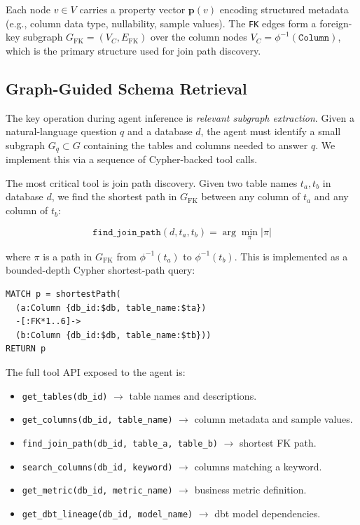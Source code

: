 \documentclass[11pt]{article}
\begin{document}
Each node $v \in V$ carries a property vector $\mathbf{p}(v)$ encoding structured metadata (e.g., column data type, nullability, sample values).
The \texttt{FK} edges form a foreign-key subgraph $G_{\text{FK}} = (V_C, E_{\text{FK}})$ over the column nodes $V_C = \phi^{-1}(\texttt{Column})$, which is the primary structure used for join path discovery.

\subsection{Graph-Guided Schema Retrieval}

The key operation during agent inference is \emph{relevant subgraph extraction}.
Given a natural-language question $q$ and a database $d$, the agent must identify a small subgraph $G_q \subset G$ containing the tables and columns needed to answer $q$.
We implement this via a sequence of Cypher-backed tool calls.

The most critical tool is join path discovery.
Given two table names $t_a, t_b$ in database $d$, we find the shortest path in $G_{\text{FK}}$ between any column of $t_a$ and any column of $t_b$:

\[
\texttt{find\_join\_path}(d, t_a, t_b) = \arg\min_{\pi} |\pi|
\]

where $\pi$ is a path in $G_{\text{FK}}$ from $\phi^{-1}(t_a)$ to $\phi^{-1}(t_b)$.
This is implemented as a bounded-depth Cypher shortest-path query:

\begin{verbatim}
MATCH p = shortestPath(
  (a:Column {db_id:$db, table_name:$ta})
  -[:FK*1..6]->
  (b:Column {db_id:$db, table_name:$tb}))
RETURN p
\end{verbatim}

The full tool API exposed to the agent is:

\begin{itemize}[leftmargin=*]
  \item \texttt{get\_tables(db\_id)} $\to$ table names and descriptions.
  \item \texttt{get\_columns(db\_id, table\_name)} $\to$ column metadata and sample values.
  \item \texttt{find\_join\_path(db\_id, table\_a, table\_b)} $\to$ shortest FK path.
  \item \texttt{search\_columns(db\_id, keyword)} $\to$ columns matching a keyword.
  \item \texttt{get\_metric(db\_id, metric\_name)} $\to$ business metric definition.
  \item \texttt{get\_dbt\_lineage(db\_id, model\_name)} $\to$ dbt model dependencies.
\end{itemize}
\end{document}

